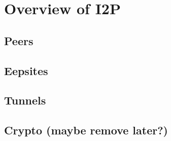 \chapter{Overview of I2P}
\label{chap:overview_of_i2p}

\section{Peers}
\label{sec:peers}

\section{Eepsites}
\label{sec:eepsites}

\section{Tunnels}
\label{sec:tunnels}

\section{Crypto (maybe remove later?)}
\label{sec:crypto}

